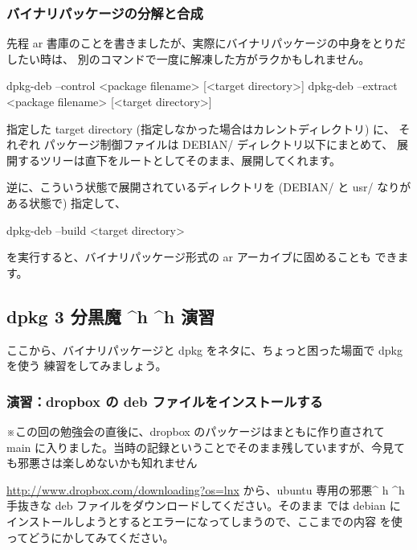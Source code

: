 \documentclass[mingoth,a4paper]{jsarticle}
\begin{document}
\subsubsection{バイナリパッケージの分解と合成}

先程 ar 書庫のことを書きましたが、実際にバイナリパッケージの中身をとりだしたい時は、
別のコマンドで一度に解凍した方がラクかもしれません。

\begin{commandline}
dpkg-deb --control <package filename> [<target directory>]
dpkg-deb --extract <package filename> [<target directory>]
\end{commandline}

指定した target directory (指定しなかった場合はカレントディレクトリ) に、
それぞれ
パッケージ制御ファイルは DEBIAN/ ディレクトリ以下にまとめて、
展開するツリーは直下をルートとしてそのまま、展開してくれます。

逆に、こういう状態で展開されているディレクトリを (DEBIAN/ と usr/ なりが
ある状態で) 指定して、

\begin{commandline}
dpkg-deb --build <target directory>
\end{commandline}

を実行すると、バイナリパッケージ形式の ar アーカイブに固めることも
できます。

\subsection{dpkg 3 分黒魔 \textasciicircum h \textasciicircum h 演習}

ここから、バイナリパッケージと dpkg をネタに、ちょっと困った場面で dpkg を使う
練習をしてみましょう。

\subsubsection{演習：dropbox の deb ファイルをインストールする}

※この回の勉強会の直後に、dropbox のパッケージはまともに作り直されて main に入りました。当時の記録ということでそのまま残していますが、今見ても邪悪さは楽しめないかも知れません

\url{http://www.dropbox.com/downloading?os=lnx} から、ubuntu 専用の邪悪\textasciicircum
h \textasciicircum h 手抜きな deb ファイルをダウンロードしてください。そのまま
では debian にインストールしようとするとエラーになってしまうので、ここまでの内容
を使ってどうにかしてみてください。
\end{document}
